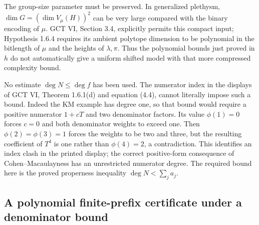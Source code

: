 \documentclass[11pt,a4paper]{article}
\begin{document}
The group-size parameter must be preserved. In generalized plethysm,
$\dim G=(\dim V_\mu(H))^2$ can be very large compared with the binary
encoding of $\mu$. GCT VI, Section 3.4, explicitly permits this compact
input; Hypothesis 1.6.4 requires its ambient polytope dimension to be
polynomial in the bitlength of $\mu$ and the heights of $\lambda,\pi$.
Thus the polynomial bounds just proved in $h$ do not automatically give
a uniform shifted model with that more compressed complexity bound.

No estimate $\deg N\le\deg f$ has been used. The numerator index in
the displays of GCT VI, Theorem 1.6.1(d) and equation (4.4), cannot
literally impose such a bound. Indeed the KM example has degree one,
so that bound would require a positive numerator $1+cT$ and two
denominator factors. Its value $\phi(1)=0$ forces $c=0$ and both
denominator weights to exceed one. Then $\phi(2)=\phi(3)=1$ forces
the weights to be two and three, but the resulting coefficient of
$T^4$ is one rather than $\phi(4)=2$, a contradiction. This identifies
an index clash in the printed display; the correct positive-form
consequence of Cohen--Macaulayness has an unrestricted numerator degree.
The required bound here is the proved properness inequality
$\deg N<\sum_j a_j$.


\subsection{A polynomial finite-prefix certificate under a denominator bound}
\end{document}
